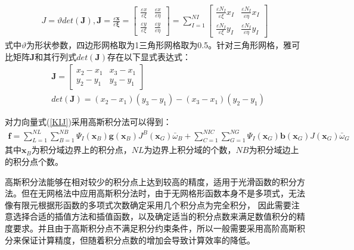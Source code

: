 \begin{equation}
\begin{split}
    J=\vartheta det(\pmb J),\pmb{J}=\frac{\varepsilon\pmb{x}}{\varepsilon\pmb{\xi}}=
    \left[\begin{matrix}
        \frac{\varepsilon x}{\varepsilon\xi}&\frac{\varepsilon x}{\varepsilon\eta}
        \\\frac{\varepsilon y}{\varepsilon\xi}&\frac{\varepsilon y}{\varepsilon\eta}
    \end{matrix}\right]=\sum_{I=1}^{N\!I}
    \left[\begin{matrix}
        \frac{\varepsilon N_I}{\varepsilon\xi}x_I&\frac{\varepsilon N_I}{\varepsilon\eta}x_I
        \\\frac{\varepsilon N_I}{\varepsilon\xi}y_I&\frac{\varepsilon N_I}{\varepsilon\eta}y_I
    \end{matrix}\right]
\end{split}
\end{equation}
式中$\vartheta$为形状参数，四边形网格取为1三角形网格取为0.5。针对三角形网格，雅可比矩阵$\pmb{J}$和其行列式$det(\pmb{J})$存在以下显式表达式：
\begin{equation}
\begin{split}
    &\pmb{J}=\left[\begin{matrix}
       x_2-x_1&x_3-x_1\\y_2-y_1&y_3-y_1
    \end{matrix}\right]\\
&det(\pmb{J})=(x_2-x_1)(y_3-y_1)-(x_3-x_1)(y_2-y_1)
\end{split}
\end{equation}\par
对力向量式(\ref{KIJ})采用高斯积分法可以得到：
\begin{equation}
\begin{split}
   \pmb{f}=\sum_{L=1}^{N\!L}\sum_{B=1}^{N\!B}\Psi_I(\pmb{x}_B)\pmb{g}(\pmb{x}_B)J^B(\pmb{x}_G)\bar{\omega}_B+\sum_{C=1}^{N\!I\!C}\sum_{G=1}^{N\!G}\Psi_I(\pmb{x}_G)\pmb{b}(\pmb{x}_G)J(\pmb{x}_G)\bar{\omega}_G
\end{split}
\end{equation}
其中$\pmb{x}_B$为积分域边界上的积分点，$N\!L$为边界上积分域的个数，$N\!B$为积分域边上的积分点个数。\par
高斯积分法能够在相对较少的积分点上达到较高的精度，适用于光滑函数的积分方法。但在无网格法中应用高斯积分法时，由于无网格形函数本身不是多项式，无法像有限元根据形函数的多项式次数确定采用几个积分点为完全积分，
因此需要注意选择合适的插值方法和插值函数，以及确定适当的积分点数来满足数值积分的精度要求。并且由于高斯积分点不满足积分约束条件，所以一般需要采用高阶高斯积分来保证计算精度，但随着积分点数的增加会导致计算效率的降低。
